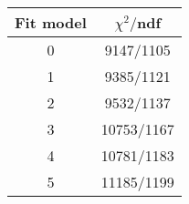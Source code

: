 \begin{tabular}{c|c}
Fit model & $\chi^2/$ndf \\
\hline
0 & 9147/1105\\
1 & 9385/1121\\
2 & 9532/1137\\
3 & 10753/1167\\
4 & 10781/1183\\
5 & 11185/1199\\
\end{tabular}
